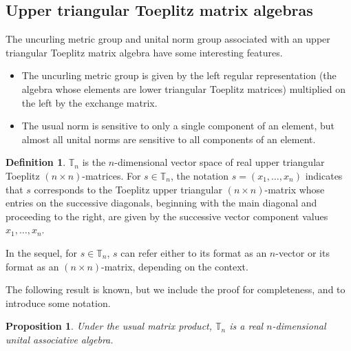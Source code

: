 \documentclass{amsart}
\numberwithin{equation}{section}
\newtheorem{proposition}[theorem]{Proposition}
\theoremstyle{definition}
\newtheorem{definition}[theorem]{Definition}
\numberwithin{theorem}{section}
\begin{document}
\subsection{Upper triangular Toeplitz matrix algebras}

The uncurling metric group and unital norm group associated with an upper triangular Toeplitz matrix algebra have some interesting features.
\begin{itemize}\item The uncurling metric group is given by the left regular representation (the algebra whose elements are lower triangular Toeplitz matrices) multiplied on the left by the exchange matrix. \item The usual norm is sensitive to only a single component of an element, but almost all unital norms are sensitive to all components of an element.\end{itemize}

\bigskip
 
 \begin{definition}\label{5/4/22.1} $\mathbb{T}_n$ is the $n$-dimensional vector space of real upper triangular Toeplitz $(n\times n)$-matrices. For $s\in \mathbb{T}_n$, the notation $s=(x_1,\dots,x_n)$ indicates that $s$ corresponds to the Toeplitz upper triangular $(n\times n)$-matrix whose entries on the successive diagonals, beginning with the main diagonal and proceeding to the right, are given by the successive vector component values $x_1,\dots,x_n$.   
\end{definition}

In the sequel, for $s\in \mathbb{T}_n$, $s$ can refer either to its format as an $n$-vector or its format as an $(n\times n)$-matrix, depending on the context.

The following result is known, but we include the proof for completeness, and to introduce some notation.  
 \begin{proposition}\label{5/10/22.1} Under the usual matrix product, $\mathbb{T}_n$ is a real $n$-dimensional unital associative algebra.\end{proposition} 
 
\end{document}
